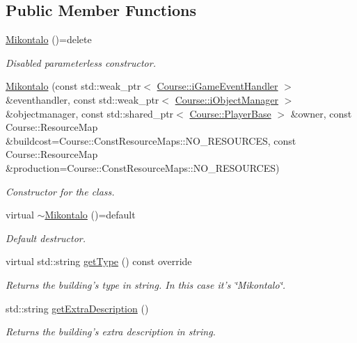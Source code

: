 \subsection*{Public Member Functions}
\begin{DoxyCompactItemize}
\item 
\hypertarget{class_student_1_1_mikontalo_a6cd21de75404e73cf369afd0a51861d7}{\hyperlink{class_student_1_1_mikontalo_a6cd21de75404e73cf369afd0a51861d7}{Mikontalo} ()=delete}\label{class_student_1_1_mikontalo_a6cd21de75404e73cf369afd0a51861d7}

\begin{DoxyCompactList}\small\item\em Disabled parameterless constructor. \end{DoxyCompactList}\item 
\hyperlink{class_student_1_1_mikontalo_a6b3e2c88efbb21cd4b0f57ee5ecfa2e6}{Mikontalo} (const std\-::weak\-\_\-ptr$<$ \hyperlink{class_course_1_1i_game_event_handler}{Course\-::i\-Game\-Event\-Handler} $>$ \&eventhandler, const std\-::weak\-\_\-ptr$<$ \hyperlink{class_course_1_1i_object_manager}{Course\-::i\-Object\-Manager} $>$ \&objectmanager, const std\-::shared\-\_\-ptr$<$ \hyperlink{class_course_1_1_player_base}{Course\-::\-Player\-Base} $>$ \&owner, const Course\-::\-Resource\-Map \&buildcost=Course\-::\-Const\-Resource\-Maps\-::\-N\-O\-\_\-\-R\-E\-S\-O\-U\-R\-C\-E\-S, const Course\-::\-Resource\-Map \&production=Course\-::\-Const\-Resource\-Maps\-::\-N\-O\-\_\-\-R\-E\-S\-O\-U\-R\-C\-E\-S)
\begin{DoxyCompactList}\small\item\em Constructor for the class. \end{DoxyCompactList}\item 
\hypertarget{class_student_1_1_mikontalo_ab4fa78934d9660213ff8b1c5fccfa903}{virtual \hyperlink{class_student_1_1_mikontalo_ab4fa78934d9660213ff8b1c5fccfa903}{$\sim$\-Mikontalo} ()=default}\label{class_student_1_1_mikontalo_ab4fa78934d9660213ff8b1c5fccfa903}

\begin{DoxyCompactList}\small\item\em Default destructor. \end{DoxyCompactList}\item 
virtual std\-::string \hyperlink{class_student_1_1_mikontalo_a71ab64374c57380dd45efea5a5304104}{get\-Type} () const override
\begin{DoxyCompactList}\small\item\em Returns the building's type in string. In this case it's \char`\"{}\-Mikontalo\char`\"{}. \end{DoxyCompactList}\item 
std\-::string \hyperlink{class_student_1_1_mikontalo_ad04d2288dfb6f9fbb9ce507f939f7db3}{get\-Extra\-Description} ()
\begin{DoxyCompactList}\small\item\em Returns the building's extra description in string. \end{DoxyCompactList}\end{DoxyCompactItemize}
